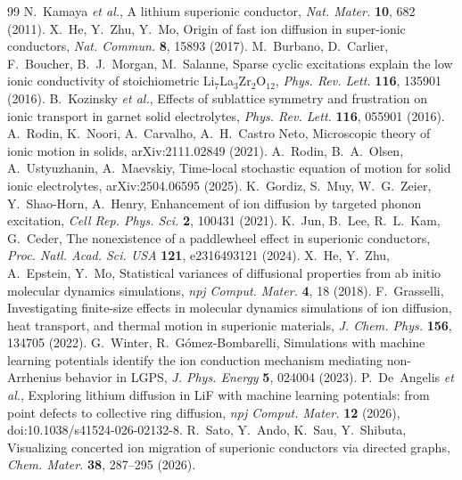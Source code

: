\documentclass[11pt,a4paper]{article}
\begin{document}
\begin{thebibliography}{99}
\small
\setlength{\itemsep}{0pt}
 N.~Kamaya \textit{et al.}, A lithium superionic conductor, \textit{Nat. Mater.} \textbf{10}, 682 (2011).
 X.~He, Y.~Zhu, Y.~Mo, Origin of fast ion diffusion in super-ionic conductors, \textit{Nat. Commun.} \textbf{8}, 15893 (2017).
 M.~Burbano, D.~Carlier, F.~Boucher, B.~J.~Morgan, M.~Salanne, Sparse cyclic excitations explain the low ionic conductivity of stoichiometric Li$_7$La$_3$Zr$_2$O$_{12}$, \textit{Phys. Rev. Lett.} \textbf{116}, 135901 (2016).
 B.~Kozinsky \textit{et al.}, Effects of sublattice symmetry and frustration on ionic transport in garnet solid electrolytes, \textit{Phys. Rev. Lett.} \textbf{116}, 055901 (2016).
 A.~Rodin, K.~Noori, A.~Carvalho, A.~H.~Castro Neto, Microscopic theory of ionic motion in solids, arXiv:2111.02849 (2021).
 A.~Rodin, B.~A.~Olsen, A.~Ustyuzhanin, A.~Maevskiy, Time-local stochastic equation of motion for solid ionic electrolytes, arXiv:2504.06595 (2025).
 K.~Gordiz, S.~Muy, W.~G.~Zeier, Y.~Shao-Horn, A.~Henry, Enhancement of ion diffusion by targeted phonon excitation, \textit{Cell Rep. Phys. Sci.} \textbf{2}, 100431 (2021).
 K.~Jun, B.~Lee, R.~L.~Kam, G.~Ceder, The nonexistence of a paddlewheel effect in superionic conductors, \textit{Proc. Natl. Acad. Sci. USA} \textbf{121}, e2316493121 (2024).
 X.~He, Y.~Zhu, A.~Epstein, Y.~Mo, Statistical variances of diffusional properties from ab initio molecular dynamics simulations, \textit{npj Comput. Mater.} \textbf{4}, 18 (2018).
 F.~Grasselli, Investigating finite-size effects in molecular dynamics simulations of ion diffusion, heat transport, and thermal motion in superionic materials, \textit{J. Chem. Phys.} \textbf{156}, 134705 (2022).
 G.~Winter, R.~G\'omez-Bombarelli, Simulations with machine learning potentials identify the ion conduction mechanism mediating non-Arrhenius behavior in LGPS, \textit{J. Phys. Energy} \textbf{5}, 024004 (2023).
 P.~De~Angelis \textit{et al.}, Exploring lithium diffusion in LiF with machine learning potentials: from point defects to collective ring diffusion, \textit{npj Comput. Mater.} \textbf{12} (2026), doi:10.1038/s41524-026-02132-8.
 R.~Sato, Y.~Ando, K.~Sau, Y.~Shibuta, Visualizing concerted ion migration of superionic conductors via directed graphs, \textit{Chem. Mater.} \textbf{38}, 287--295 (2026).

\end{thebibliography}
\end{document}
